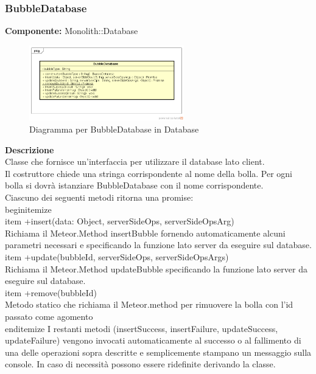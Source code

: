 \subsubsection{BubbleDatabase}
\textbf{Componente:}  Monolith::Database\\
   \FloatBarrier
   \begin{figure}[ht]
   \centering
   \includegraphics[width=0.6\textwidth]{img/single-BubbleDatabase}
   \caption{{Diagramma per BubbleDatabase in Database}}
\end{figure}
\FloatBarrier
\textbf{Descrizione}\\
Classe che fornisce un'interfaccia per utilizzare il database lato client. 
\\
Il costruttore chiede una stringa corrispondente al nome della bolla. Per ogni bolla si dovrà istanziare BubbleDatabase con il nome corrispondente.
\\
Ciascuno dei seguenti metodi ritorna una promise:
\\begin{itemize} 
\\item +insert(data: Object, serverSideOps, serverSideOpsArg) \\
Richiama il Meteor.Method insertBubble fornendo automaticamente alcuni parametri necessari e specificando la funzione lato server da eseguire sul database. 
\\item +update(bubbleId, serverSideOps, serverSideOpsArgs) \\
Richiama il Meteor.Method updateBubble specificando la funzione lato server da eseguire sul database.
\\item +remove(bubbleId) \\
Metodo statico che richiama il Meteor.method per rimuovere la bolla con l'id passato come agomento
\\end{itemize}
I restanti metodi (insertSuccess, insertFailure, updateSuccess, updateFailure) vengono invocati automaticamente al successo o al fallimento di una delle operazioni sopra descritte e semplicemente stampano un messaggio sulla console. In caso di necessità possono essere ridefinite derivando la classe. 


